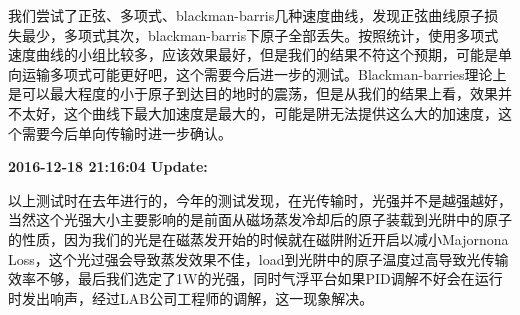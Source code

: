 \documentclass[onecolumn,a4paper,10pt]{article}
\begin{document}
我们尝试了正弦、多项式、blackman-barris几种速度曲线，发现正弦曲线原子损失最少，多项式其次，blackman-barris下原子全部丢失。按照统计，使用多项式速度曲线的小组比较多，应该效果最好，但是我们的结果不符这个预期，可能是单向运输多项式可能更好吧，这个需要今后进一步的测试。Blackman-barries理论上是可以最大程度的小于原子到达目的地时的震荡，但是从我们的结果上看，效果并不太好，这个曲线下最大加速度是最大的，可能是阱无法提供这么大的加速度，这个需要今后单向传输时进一步确认。

\textbf{2016-12-18 21:16:04 Update:}

以上测试时在去年进行的，今年的测试发现，在光传输时，光强并不是越强越好，当然这个光强大小主要影响的是前面从磁场蒸发冷却后的原子装载到光阱中的原子的性质，因为我们的光是在磁蒸发开始的时候就在磁阱附近开启以减小Majornona Loss，这个光过强会导致蒸发效果不佳，load到光阱中的原子温度过高导致光传输效率不够，最后我们选定了1W的光强，同时气浮平台如果PID调解不好会在运行时发出响声，经过LAB公司工程师的调解，这一现象解决。







\small


\end{document}
